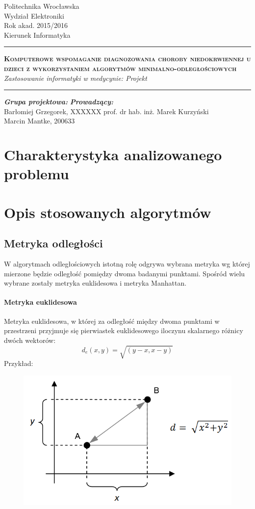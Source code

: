\documentclass[11pt, a4paper, titlepage]{report}
\date{Wrocław, 06.06.2016}
\makeatletter
\renewcommand{\maketitle}{\begin{titlepage}
		\begin{center}\small
			Politechnika Wrocławska\\
			Wydział Elektroniki\\
			Rok akad. 2015/2016\\
			Kierunek Informatyka\\
			\vspace{3cm}
			\rule{\linewidth}{0.4pt}
				\huge \textsc{\textbf{Komputerowe wspomaganie diagnozowania choroby niedokrwiennej u dzieci z wykorzystaniem algorytmów minimalno-odległościowych}}
				\vspace{0.5cm} \\
				\normalsize \textit{Zastosowanie informatyki w medycynie: Projekt}
			\rule{\linewidth}{0.4pt}
		\end{center}

		\vspace{3cm}
		\begin{flushleft}
			\textbf{\textit{Grupa projektowa:}} \hspace{6.5cm} \textbf{\textit{Prowadzący:}} \\
			Barłomiej Grzegorek, XXXXXX \hfill{prof. dr hab. inż. Marek Kurzyński} \\
			Marcin Mantke, 200633\\
			\vspace{2cm}
		\end{flushleft}
		\vspace*{\stretch{6}}
		\begin{center}
			\@date
		\end{center}
	\end{titlepage}%
}
\makeatother
\begin{document}
\maketitle
\tableofcontents
\cleardoublepage
{}
{}
\listoffigures

\cleardoublepage
{}
{}
\lstlistoflistings
\chapter{Charakterystyka analizowanego problemu}
\label{chap:Charakterystyka analizowanego problemu}

\chapter{Opis stosowanych algorytmów}
\label{chap:Opis stosowanych algorytmów}
\section{Metryka odległości}
\label{sec:Metryka odległości}
W algorytmach odległościowych istotną rolę odgrywa wybrana metryka wg której mierzone będzie odległość pomiędzy dwoma badanymi punktami. Spośród wielu wybrane zostały metryka euklidesowa i metryka Manhattan.
\subsubsection{Metryka euklidesowa}
\label{subs:Metryka euklidesowa}
Metryka euklidesowa, w której za odległość między dwoma punktami w przestrzeni przyjmuje się pierwiastek euklidesowego iloczynu skalarnego różnicy dwóch wektorów:
$$d_e(x,y) = \sqrt{(y-x, x-y)}$$
Przykład:
\begin{figure}[h]
  \includegraphics[scale=0.5]{obrazki/euklides}
\end{figure}
\end{document}
